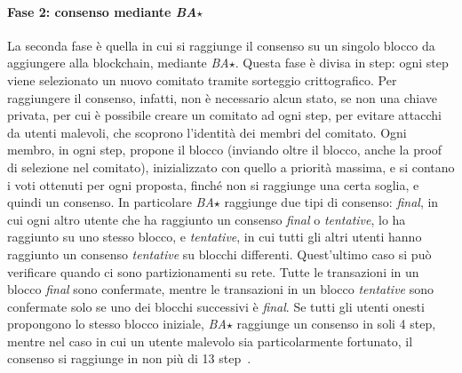 \paragraph*{Fase 2: consenso mediante \emph{BA$\star$}}
La seconda fase è quella in cui si raggiunge il consenso su un singolo blocco da aggiungere alla blockchain, mediante \emph{BA$\star$}. Questa fase è divisa in step: ogni step viene selezionato un nuovo comitato tramite sorteggio crittografico. Per raggiungere il consenso, infatti, non è necessario alcun stato, se non una chiave privata, per cui è possibile creare un comitato ad ogni step, per evitare attacchi da utenti malevoli, che scoprono l'identità dei membri del comitato.
Ogni membro, in ogni step, propone il blocco (inviando oltre il blocco, anche la proof di selezione nel comitato), inizializzato con quello a priorità massima, e si contano i voti ottenuti per ogni proposta, finché non si raggiunge una certa soglia, e quindi un consenso. In particolare \emph{BA$\star$} raggiunge due tipi di consenso: \emph{final}, in cui ogni altro utente che ha raggiunto un consenso \emph{final} o \emph{tentative}, lo ha raggiunto su uno stesso blocco, e \emph{tentative}, in cui tutti gli altri utenti hanno raggiunto un consenso \emph{tentative} su blocchi differenti. Quest'ultimo caso si può verificare quando ci sono partizionamenti su rete. Tutte le transazioni in un blocco \emph{final} sono confermate, mentre le transazioni in un blocco \emph{tentative} sono confermate solo se uno dei blocchi successivi è \emph{final}.
Se tutti gli utenti onesti propongono lo stesso blocco iniziale, \emph{BA$\star$} raggiunge un consenso in soli 4 step, mentre nel caso in cui un utente malevolo sia particolarmente fortunato, il consenso si raggiunge in non più di 13 step~\cite{chen2019algorand}.

